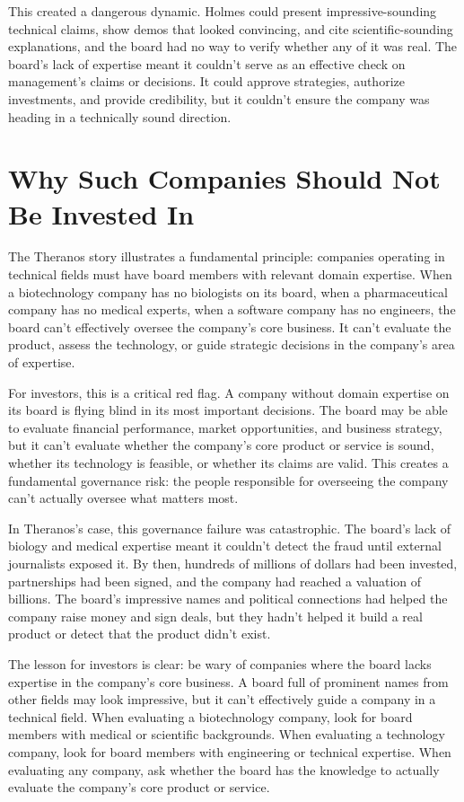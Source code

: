 This created a dangerous dynamic. Holmes could present impressive-sounding technical claims, show demos that looked convincing, and cite scientific-sounding explanations, and the board had no way to verify whether any of it was real. The board's lack of expertise meant it couldn't serve as an effective check on management's claims or decisions. It could approve strategies, authorize investments, and provide credibility, but it couldn't ensure the company was heading in a technically sound direction.

\section{Why Such Companies Should Not Be Invested In}

The Theranos story illustrates a fundamental principle: companies operating in technical fields must have board members with relevant domain expertise. When a biotechnology company has no biologists on its board, when a pharmaceutical company has no medical experts, when a software company has no engineers, the board can't effectively oversee the company's core business. It can't evaluate the product, assess the technology, or guide strategic decisions in the company's area of expertise.

For investors, this is a critical red flag. A company without domain expertise on its board is flying blind in its most important decisions. The board may be able to evaluate financial performance, market opportunities, and business strategy, but it can't evaluate whether the company's core product or service is sound, whether its technology is feasible, or whether its claims are valid. This creates a fundamental governance risk: the people responsible for overseeing the company can't actually oversee what matters most.

In Theranos's case, this governance failure was catastrophic. The board's lack of biology and medical expertise meant it couldn't detect the fraud until external journalists exposed it. By then, hundreds of millions of dollars had been invested, partnerships had been signed, and the company had reached a valuation of billions. The board's impressive names and political connections had helped the company raise money and sign deals, but they hadn't helped it build a real product or detect that the product didn't exist.

The lesson for investors is clear: be wary of companies where the board lacks expertise in the company's core business. A board full of prominent names from other fields may look impressive, but it can't effectively guide a company in a technical field. When evaluating a biotechnology company, look for board members with medical or scientific backgrounds. When evaluating a technology company, look for board members with engineering or technical expertise. When evaluating any company, ask whether the board has the knowledge to actually evaluate the company's core product or service.

